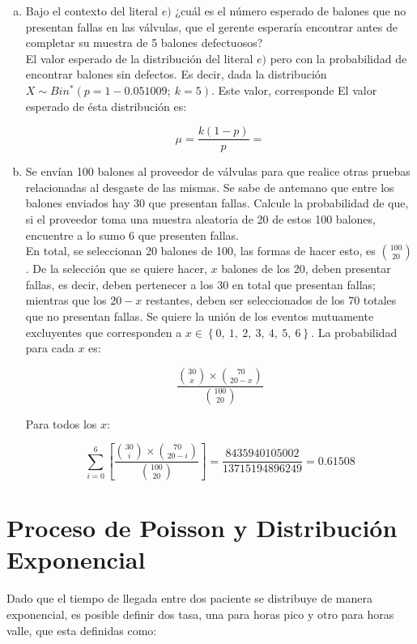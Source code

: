 \documentclass[11pt, spanish]{article}
\begin{document}
\begin{enumerate}[(a)]
\item Bajo el contexto del literal $e)$ ¿cuál es el número esperado de balones que no
presentan fallas en las válvulas, que el gerente esperaría encontrar antes de completar su
muestra de 5 balones defectuosos?\\

El valor esperado de la distribución del literal $e)$ pero con la probabilidad de encontrar balones sin defectos. Es decir, dada la distribución $X \sim Bin^{*}(p = 1 - 0.051009;\ k = 5)$. Este valor, corresponde El valor esperado de ésta distribución es:

$$\mu = \frac{k(1 - p)}{p} = $$

\item Se envían 100 balones al proveedor de válvulas para que realice otras pruebas
relacionadas al desgaste de las mismas. Se sabe de antemano que entre los balones
enviados hay 30 que presentan fallas. Calcule la probabilidad de que, si el proveedor toma
una muestra aleatoria de 20 de estos 100 balones, encuentre a lo sumo 6 que presenten
fallas.\\

En total, se seleccionan 20 balones de 100, las formas de hacer esto, es $\binom{100}{20}$. De la selección que se quiere hacer, $x$ balones de los 20, deben presentar fallas, es decir, deben pertenecer a los 30 en total que presentan fallas; mientras que los $20 - x$ restantes, deben ser seleccionados de los 70 totales que no presentan fallas. Se quiere la unión de los eventos mutuamente excluyentes que corresponden a $x \in \left\{ 0,\ 1,\ 2,\ 3,\ 4,\ 5,\ 6 \right\}$. La probabilidad para cada $x$ es:

$$\frac{\binom{30}{x} \times \binom{70}{20 - x}}{\binom{100}{20}}$$

Para todos los $x$:

$$\sum_{i = 0}^{6} \left[ \frac{\binom{30}{i} \times \binom{70}{20 - i}}{\binom{100}{20}} \right] = \frac{8435940105002}{13715194896249} = 0.61508$$

\end{enumerate}

\pagebreak
\section{Proceso de Poisson y Distribución Exponencial}

Dado que el tiempo de llegada entre dos paciente se distribuye de manera exponencial, es
posible definir dos tasa, una para horas pico y otro para horas valle, que esta definidas
como:
\end{document}
